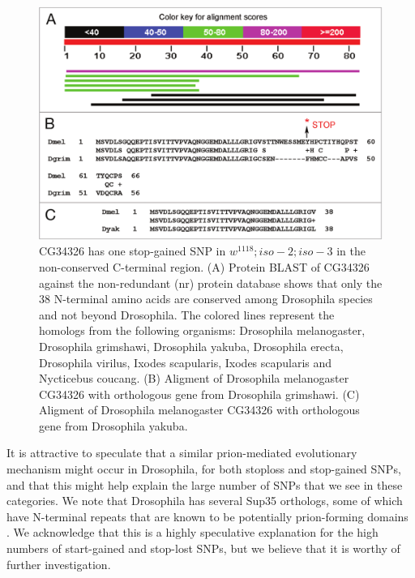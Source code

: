 \begin{figure}
    \centering
    \includegraphics[width=14cm]{snpeff_fig4.png}
    \caption{
CG34326 has one stop-gained SNP in $w^{1118} ; iso-2; iso-3$ in the non-conserved C-terminal region. (A) Protein BLAST of CG34326 against the non-redundant (nr) protein database shows that only the 38 N-terminal amino acids are conserved among Drosophila species and not beyond Drosophila. The colored lines represent the homologs from the following organisms: Drosophila melanogaster, Drosophila grimshawi, Drosophila yakuba, Drosophila erecta, Drosophila virilus, Ixodes
scapularis, Ixodes scapularis and Nycticebus coucang. (B) Aligment of Drosophila melanogaster CG34326 with orthologous gene from Drosophila grimshawi. (C) Aligment of Drosophila melanogaster CG34326 with orthologous gene from Drosophila yakuba.}
    \label{fig:snpeffTab3}
\end{figure}

It is attractive to speculate that a similar prion-mediated evolutionary mechanism might occur in Drosophila, for both stoploss and stop-gained SNPs, and that this might help explain the large number of SNPs that we see in these categories. We note that Drosophila has several Sup35 orthologs, some of which have N-terminal repeats that are known to be potentially prion-forming domains \cite{tyedmers2008prion}. We acknowledge that this is a highly speculative explanation for the high numbers of start-gained and stop-lost SNPs, but we believe that it is worthy of further investigation.

